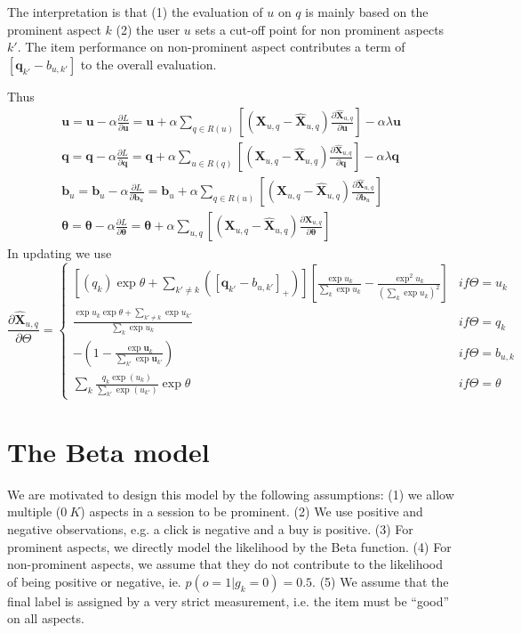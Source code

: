 \documentclass[11pt]{report}
\begin{document}
The interpretation is that (1) the evaluation of $u$ on $q$ is mainly based on the prominent aspect $k$ (2) the user $u$ sets a cut-off point for non prominent aspects $k'$. The item performance on non-prominent aspect contributes a term of $[\mathbf{q}_{k'}-b_{u,k'}] $ to the overall evaluation.
 
Thus \begin{eqnarray}
 \mathbf{u}= \mathbf{u} - \alpha \frac{\partial L}{\partial \mathbf{u}} =  \mathbf{u} +  \alpha \sum_{q\in R(u)}[ (\mathbf{X}_{u,q}- \hat{\mathbf{X}}_{u,q})\frac{\partial \hat{\mathbf{X}}_{u,q}}{\partial \mathbf{u}}] - \alpha\lambda \mathbf{u} \\\nonumber
 \mathbf{q} =  \mathbf{q} - \alpha \frac{\partial L}{\partial \mathbf{q}}=  \mathbf{q} +  \alpha \sum_{u\in R(q)}[ (\mathbf{X}_{u,q}- \hat{\mathbf{X}}_{u,q})\frac{\partial \hat{\mathbf{X}}_{u,q}}{\partial \mathbf{q}}] - \alpha\lambda \mathbf{q} \\\nonumber
 \mathbf{b}_{u} =  \mathbf{b}_{u} - \alpha \frac{\partial L}{\partial \mathbf{b}_{u}}=  \mathbf{b}_{u} +  \alpha \sum_{q\in R(u)}[ (\mathbf{X}_{u,q}- \hat{\mathbf{X}}_{u,q})\frac{\partial \hat{\mathbf{X}}_{u,q}}{\partial \mathbf{b}_u}]  \\\nonumber
\mathbf{\theta} =  \mathbf{\theta} - \alpha \frac{\partial L}{\partial \mathbf{\theta}}=  \mathbf{\theta} +  \alpha \sum_{u,q}[ (\mathbf{X}_{u,q}- \hat{\mathbf{X}}_{u,q})\frac{\partial \hat{\mathbf{X}}_{u,q}}{\partial \mathbf{\theta}}] 
\end{eqnarray}
In updating we use
 \begin{equation}\label{equ:derivative}
 \frac{\partial \hat{\mathbf{X}}_{u,q}}{\partial \Theta}=\left\{\begin{matrix}
 [(q_k) \exp\theta +\sum_{k'\neq k}([\mathbf{q}_{k'}-b_{u,k'}]_+)][\frac{\exp u_k}{\sum_{k}\exp u_k}-\frac{\exp^2 u_k}{(\sum_k \exp u_k)^2}] & if \Theta=u_k \\ 
\frac{\exp u_k \exp \theta +\sum_{k'\neq k} \exp u_{k'}}{\sum_k \exp u_k}  & if \Theta= q_{k}  \\ 
-(1-\frac{\exp\mathbf{u}_k}{\sum_{k'}\exp\mathbf{u}_{k'}}) & if \Theta = b_{u,k}  \\
\sum_k  \frac{q_k \exp (u_k)}{\sum_{k'} \exp (u_{k'})} \exp \theta & if \Theta = \theta 
\end{matrix}\right.
\end{equation}

\section{The Beta model}
 We are motivated to design this model by the following assumptions: (1) we allow  multiple ($0~K$) aspects in a session to be prominent. (2) We use positive and negative observations, e.g. a click is negative and a buy is positive. (3) For prominent aspects, we directly model the likelihood by the Beta function. (4) For non-prominent aspects, we assume that they do not contribute to the likelihood of being positive or negative, ie. $p(o=1|g_k=0)=0.5$.  (5) We assume that the final label is assigned by a very strict measurement, i.e. the item must be ``good'' on all aspects.
 
\end{document}
